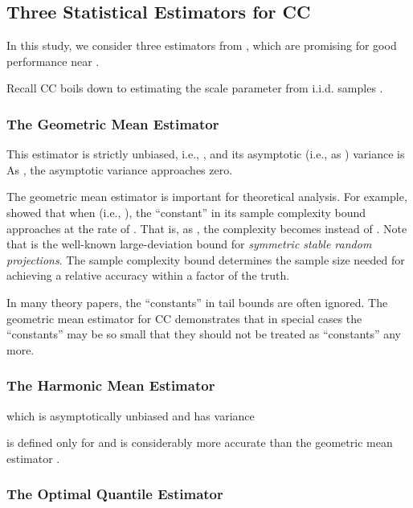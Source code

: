 \documentclass{sig-alternate}
\begin{document}
\subsection{Three Statistical Estimators for CC}

In this study, we consider three estimators from \cite{Article:Li_CC_v0,Article:Li_CC,Report:Li_CC_oq}, which are promising for good performance near .


Recall CC boils down to estimating the scale parameter  from  i.i.d. samples .

\subsubsection{The Geometric Mean Estimator}
\vspace{-0.1in}




This estimator is strictly unbiased, i.e., ,  and its asymptotic (i.e., as ) variance is
{\scriptsize }
\noindent As , the asymptotic variance  approaches zero.

The geometric mean estimator is  important for theoretical analysis. For example, \cite{Article:Li_CC} showed that when  (i.e., ), the ``constant''  in its sample complexity bound  approaches  at the rate of . That is, as , the complexity becomes  instead of  . Note that  is the well-known large-deviation bound for {\em symmetric stable random projections}. 
The sample complexity bound determines the sample size  needed for achieving a relative accuracy within a  factor of the truth.

In many theory papers, the ``constants'' in tail bounds are often ignored. The geometric mean estimator for CC demonstrates that in special cases the ``constants'' may be so small that they should not be treated as ``constants'' any more. 

\subsubsection{The Harmonic Mean Estimator}


which is asymptotically unbiased and has variance
{\small}

 is defined only for  and is considerably more accurate than the geometric mean estimator .

\subsubsection{The Optimal Quantile Estimator}
\end{document}
